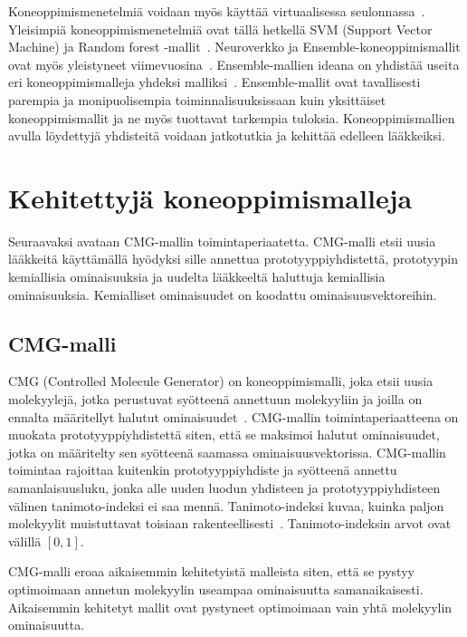 \documentclass[finnish,twoside,censored,tkt,sw-line]{HYthesisML}
\begin{document}
Koneoppimismenetelmiä voidaan myös käyttää virtuaalisessa seulonnassa~\cite{SotrifferChristoph2011VSPC}.
Yleisimpiä koneoppimismenetelmiä ovat tällä hetkellä SVM (Support Vector Machine) ja Random forest -mallit~\cite{SotrifferChristoph2011VSPC}.
Neuroverkko ja Ensemble-koneoppimismallit ovat myös yleistyneet viimevuosina~\cite{ShinBonggun,PopovaMariya2018Drlf}.
Ensemble-mallien ideana on yhdistää useita eri koneoppimismalleja yhdeksi malliksi~\cite{RokachLior2009Ec}.
Ensemble-mallit ovat tavallisesti parempia ja monipuolisempia toiminnalisuuksissaan kuin yksittäiset koneoppimismallit ja ne myös tuottavat tarkempia tuloksia.
Koneoppimismallien avulla löydettyjä yhdisteitä voidaan jatkotutkia ja kehittää edelleen lääkkeiksi.

\section{Kehitettyjä koneoppimismalleja}

Seuraavaksi avataan CMG-mallin toimintaperiaatetta.
CMG-malli etsii uusia lääkkeitä käyttämällä hyödyksi sille annettua prototyyppiyhdistettä, prototyypin kemiallisia ominaisuuksia ja uudelta lääkkeeltä haluttuja kemiallisia ominaisuuksia.
Kemialliset ominaisuudet on koodattu ominaisuusvektoreihin.

\subsection{CMG-malli}

CMG (Controlled Molecule Generator) on koneoppimismalli, joka etsii uusia molekyylejä, jotka perustuvat syötteenä annettuun molekyyliin ja joilla on ennalta määritellyt halutut ominaisuudet~\cite{ShinBonggun}.
CMG-mallin toimintaperiaatteena on muokata prototyyppiyhdistettä siten, että se maksimoi halutut ominaisuudet, jotka on määritelty sen syötteenä saamassa ominaisuusvektorissa.
CMG-mallin toimintaa rajoittaa kuitenkin prototyyppiyhdiste ja syötteenä annettu samanlaisuusluku, jonka alle uuden luodun yhdisteen ja prototyyppiyhdisteen välinen tanimoto-indeksi ei saa mennä.
Tanimoto-indeksi kuvaa, kuinka paljon molekyylit muistuttavat toisiaan rakenteellisesti~\cite{MaggioraGerald2014Msim}.
Tanimoto-indeksin arvot ovat välillä \([0,1]\).

CMG-malli eroaa aikaisemmin kehitetyistä malleista siten, että se pystyy optimoimaan annetun molekyylin useampaa ominaisuutta samanaikaisesti.
Aikaisemmin kehitetyt mallit ovat pystyneet optimoimaan vain yhtä molekyylin ominaisuutta.
\end{document}
